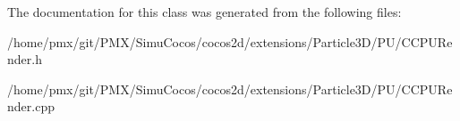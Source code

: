 The documentation for this class was generated from the following files\+:\begin{DoxyCompactItemize}
\item 
/home/pmx/git/\+P\+M\+X/\+Simu\+Cocos/cocos2d/extensions/\+Particle3\+D/\+P\+U/C\+C\+P\+U\+Render.\+h\item 
/home/pmx/git/\+P\+M\+X/\+Simu\+Cocos/cocos2d/extensions/\+Particle3\+D/\+P\+U/C\+C\+P\+U\+Render.\+cpp\end{DoxyCompactItemize}
